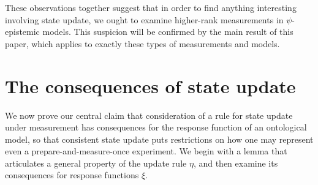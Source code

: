 \documentclass[%
 reprint, onecolumn, 12pt,
superscriptaddress,
nofootinbib,
 prx, 
]{quantumarticle}
\begin{document}
These observations together suggest that in order to find anything
interesting involving state update, we ought to examine higher-rank
measurements in $\psi$-epistemic models. This suspicion will be
confirmed by the main result of this paper, which applies to exactly
these types of measurements and models.

\section{The consequences of state update}

\label{sec:main-thm}
We now prove our central claim that consideration of a rule for state
update under measurement has consequences for the response function of
an ontological model, so that consistent state update puts
restrictions on how one may represent even a prepare-and-measure-once
experiment. We begin with a lemma that articulates a general property
of the update rule $\eta$, and then examine its consequences for
response functions $\xi$.
\end{document}
